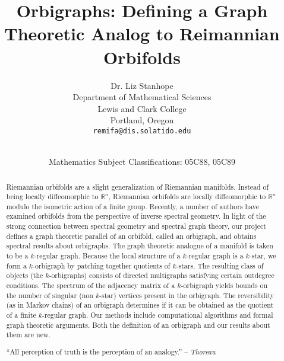 \documentclass[12pt]{article}
\title{\bf Orbigraphs: Defining a Graph Theoretic Analog to Reimannian Orbifolds}
\author{Dr. Liz Stanhope\\
\small Department of Mathematical Sciences\\[-0.8ex]
\small Lewis and Clark College\\[-0.8ex] 
\small Portland, Oregon\\
\small\tt remifa@dis.solatido.edu\\
}
\date{\dateline{July 29, 2013}{July 29, 2013}\\
\small Mathematics Subject Classifications: 05C88, 05C89}
\theoremstyle{plain}
\theoremstyle{definition}
\theoremstyle{remark}
\begin{document}
\maketitle


\begin{abstract}
Riemannian orbifolds are a slight generalization of Riemannian manifolds.  Instead of being locally diffeomorphic to $\mathbb{R}^n$, Riemannian orbifolds are locally diffeomorphic to $\mathbb{R}^n$ modulo the isometric action of a finite group.  Recently, a number of authors have examined orbifolds from the perspective of inverse spectral geometry.  In light of the strong connection between spectral geometry and spectral graph theory, our project defines a graph theoretic parallel of an orbifold, called an orbigraph, and obtains spectral results about orbigraphs.  The graph theoretic analogue of a manifold is taken to be a $k$-regular graph.  Because the local structure of a $k$-regular graph is a $k$-star, we form a $k$-orbigraph by patching together quotients of $k$-stars.  The resulting class of objects (the $k$-orbigraphs) consists of directed multigraphs satisfying certain outdegree conditions.  The spectrum of the adjacency matrix of a $k$-orbigraph yields bounds on the number of singular (non $k$-star) vertices present in the orbigraph.  The reversibility (as in Markov chains) of an orbigraph determines if it can be obtained as the quotient of a finite $k$-regular graph.  Our methods include computational algorithms and formal graph theoretic arguments.  Both the definition of an orbigraph and our results about them are new.

  \bigskip\noindent ``All perception of truth is the perception of an analogy.'' -- \textit{Thoreau}

\end{abstract}
\end{document}
